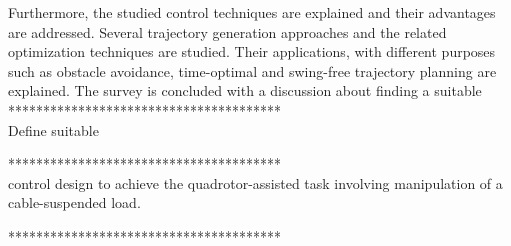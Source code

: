%
%

Furthermore, the studied control techniques are explained and their advantages are addressed. Several trajectory generation approaches and the related optimization techniques are studied. Their applications, with different purposes such as obstacle avoidance, time-optimal and swing-free trajectory planning are explained. The survey is concluded with a discussion about finding a suitable
***************************************\\
Define suitable

***************************************\\
control design to achieve the quadrotor-assisted task involving manipulation of a cable-suspended load.

***************************************\\


		
\cleardoublepage